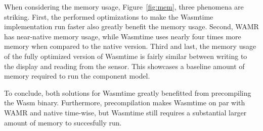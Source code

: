 

When considering the memory usage, Figure~\ref{fig:mem}, three phenomena are striking. First, the performed optimizations to make the Wasmtime implementation run faster also greatly benefit the memory usage. Second, WAMR has near-native memory usage, while Wasmtime uses nearly four times more memory when compared to the native version. Third and last, the memory usage of the fully optimized version of Wasmtime is fairly similar between writing to the display and reading from the sensor. This showcases a baseline amount of memory required to run the component model.

To conclude, both solutions for Wasmtime greatly benefitted from precompiling the Wasm binary. Furthermore, precompilation makes Wasmtime on par with WAMR and native time-wise, but Wasmtime still requires a substantial larger amount of memory to succesfully run.

